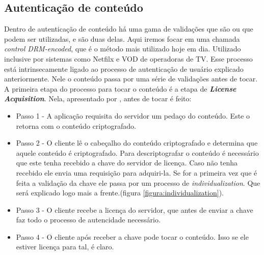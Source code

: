 \subsection{Autentica\c{c}\~ao de conte\'udo}
\label{subsection:autenticacao_conteudo}
Dentro de autentica\c{c}\~ao de conte\'udo h\'a uma gama de valida\c{c}\~oes que s\~ao ou que podem ser utilizadas, \cite{wein2012content} e \cite{leighton2007html} s\~ao duas delas.
\newline
Aqui iremos focar em uma chamada \textit{control DRM-encoded}, que \'e o m\'etodo mais utilizado hoje em dia. Utilizado inclusive por sistemas como Netfilx e VOD de operadoras de TV.
\newline
Esse processo est\'a intrinsecamente ligado ao processo de autentica\c{c}\~ao de usu\'ario explicado anteriormente. Nele o conte\'udo passa por uma s\'erie de valida\c{c}\~oes antes de tocar.
\newline
A primeira etapa do processo para tocar o conte\'udo \'e a etapa de \textbf{\textit{License Acquisition}}. Nela, apresentado por \cite{pomelo2009analysis}, antes de tocar \'e feito:
\begin{itemize}
\item Passo 1 -  A aplica\c{c}\~ao requisita do servidor um peda\c{c}o do conte\'udo. Este o retorna com o conte\'udo criptografado.
\item Passo 2 - O cliente l\^e o cabe\c{c}alho do conte\'udo criptografado e determina que aquele conte\'udo \'e criptografado. Para descriptografar o conte\'udo \'e necess\'ario que este tenha recebido a chave do servidor de licen\c{c}a. Caso n\~ao tenha recebido ele envia uma requisi\c{c}\~ao para adquiri-la. Se for a primeira vez que \'e feita a valida\c{c}\~ao da chave ele passa por um processo de \textit{individualization}. Que ser\'a explicado logo mais a frente.(figura \ref{figura:individualization}).
\item Passo 3 - O cliente recebe a licen\c{c}a do servidor, que antes de enviar a chave faz todo o processo de autencidade necess\'ario.
\item Passo 4 - O cliente ap\'os receber a chave pode tocar o conte\'udo. Isso se ele estiver licen\c{c}a para tal, \'e claro.
\end{itemize}

